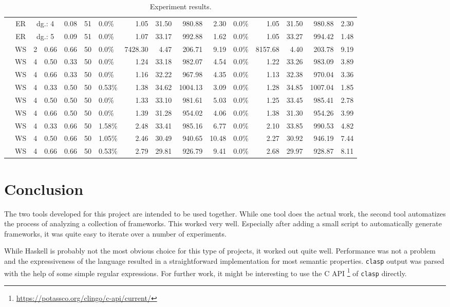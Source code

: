 \documentclass[parskip=half]{scrartcl}
\begin{document}
\begin{sidewaystable}[h!]
\begin{tabular}[h]{|c|c|r|l|l|l|l|r|r|r|r|l|r|r|r|r|}
& ER & \multicolumn{2}{|c|}{dg.: 4} & 0.08 & 51 & 0.0\% & 1.05 & 31.50 & 980.88 & 2.30 & 0.0\%  & 1.05 & 31.50 & 980.88 & 2.30\\
& ER & \multicolumn{2}{|c|}{dg.: 5} & 0.09 & 51 & 0.0\% & 1.07 & 33.17 & 992.88 & 1.62 & 0.0\%  & 1.05 & 33.27 & 994.42 & 1.48\\
\cline{2-16}
& WS & 2 & 0.66 & 0.66 & 50 &  0.0\% & 7428.30 & 4.47 & 206.71 & 9.19 & 0.0\%  & 8157.68 & 4.40 & 203.78 & 9.19\\
& WS & 4 & 0.50 & 0.33 & 50 &  0.0\% & 1.24 & 33.18 & 982.07 & 4.54 & 0.0\%  & 1.22 & 33.26 & 983.09 & 3.89\\
& WS & 4 & 0.66 & 0.33 & 50 &  0.0\% & 1.16 & 32.22 & 967.98 & 4.35 & 0.0\%  & 1.13 & 32.38 & 970.04 & 3.36\\
& WS & 4 & 0.33 & 0.50 & 50 & 0.53\% & 1.38 & 34.62 & 1004.13 & 3.09 & 0.0\% & 1.28 & 34.85 & 1007.04 & 1.85\\
& WS & 4 & 0.50 & 0.50 & 50 &  0.0\% & 1.33 & 33.10 & 981.61 & 5.03 & 0.0\%  & 1.25 & 33.45 & 985.41 & 2.78\\
& WS & 4 & 0.66 & 0.50 & 50 &  0.0\% & 1.39 & 31.28 & 954.02 & 4.06 & 0.0\%  & 1.38 & 31.30 & 954.26 & 3.99\\
& WS & 4 & 0.33 & 0.66 & 50 & 1.58\% & 2.48 & 33.41 & 985.16 & 6.77 & 0.0\%  & 2.10 & 33.85 & 990.53 & 4.82\\
& WS & 4 & 0.50 & 0.66 & 50 & 1.05\% & 2.46 & 30.49 & 940.65 & 10.48 & 0.0\% & 2.27 & 30.92 & 946.19 & 7.44\\
& WS & 4 & 0.66 & 0.66 & 50 & 0.53\% & 2.79 & 29.81 & 926.79 & 9.41 & 0.0\%  & 2.68 & 29.97 & 928.87 & 8.11\\
\hline
\end{tabular}
\caption{\label{tbl_res}Experiment results.}
\end{sidewaystable}

\section{Conclusion}
\label{conclusion}

The two tools developed for this project are intended to be used together.
While one tool does the actual work, the second tool automatizes the
process of analyzing a collection of frameworks. This worked very well.
Especially after adding a small script to automatically generate frameworks,
it was quite easy to iterate over a number of experiments.

While Haskell is probably not the most obvious choice for this type of
projects, it worked out quite well. Performance was not a problem and
the expressiveness of the language resulted in a straightforward
implementation for most semantic properties. \texttt{clasp} output
was parsed with the help of some simple regular expressions.
For further work, it might be interesting to use the C API
\footnote{\url{https://potassco.org/clingo/c-api/current/}} of
\texttt{clasp} directly.

\printbibliography
\end{document}
